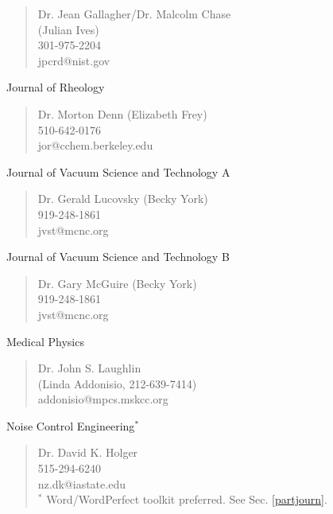 \begin{verse}
             Dr. Jean Gallagher/Dr. Malcolm Chase\\
             (Julian Ives)\\
             301-975-2204\\
             jpcrd@nist.gov
\end{verse}


\noindent      Journal of Rheology

\begin{verse}
               Dr. Morton Denn (Elizabeth Frey)\\
               510-642-0176\\
               jor@cchem.berkeley.edu
\end{verse}


\noindent      Journal of Vacuum Science and Technology A

\begin{verse}
             Dr. Gerald Lucovsky (Becky York)\\
             919-248-1861\\
             jvst@mcnc.org
\end{verse}

\noindent      Journal of Vacuum Science and Technology B

\begin{verse}
             Dr. Gary McGuire (Becky York)\\
             919-248-1861\\
             jvst@mcnc.org
\end{verse}

\noindent      Medical Physics
\begin{verse}
             Dr. John S. Laughlin\\
             (Linda Addonisio, 212-639-7414)\\
             addonisio@mpcs.mskcc.org
\end{verse}

\noindent     Noise Control Engineering$^*$   

\begin{verse}
             Dr. David K. Holger\\
             515-294-6240\\
             nz.dk@iastate.edu\\
             $^*$ Word/WordPerfect toolkit preferred. See Sec. \ref{partjourn}.
\end{verse}

